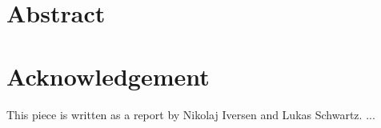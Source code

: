 \section*{Abstract}



\section*{Acknowledgement}
This piece is written as a report by Nikolaj Iversen and Lukas Schwartz.
...